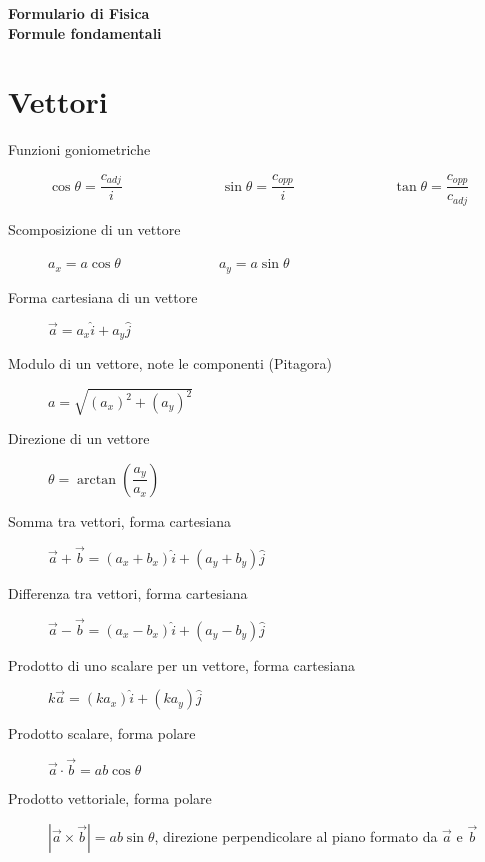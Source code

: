 \documentclass[a4paper,11pt,italian]{article}
\begin{document}
\begin{center}
\textbf{\Large \color{colorSitoScuro}Formulario di Fisica}\\
\textbf{\large \color{colorSitoScuro}Formule fondamentali}
\end{center}
\section{Vettori}
\begin{description}
  \item[Funzioni goniometriche]   $ \cos\theta = \dfrac{c_{adj}}{i} $~~~~~~~~~~~~~~$ \sin\theta = \dfrac{c_{opp}}{i} $~~~~~~~~~~~~~~$ \tan\theta = \dfrac{c_{opp}}{c_{adj}} $
  
  \item[Scomposizione di un vettore] $ a_x = a  \cos\theta $~~~~~~~~~~~~~~$ a_y = a  \sin\theta $
  
  \item[Forma cartesiana di un vettore] $ \vec{a} = a_x \hat{i} + a_y \hat{j} $
  
  \item[Modulo di un vettore, note le componenti (Pitagora)] $ a = \sqrt{(a_x)^2 + (a_y)^2} $
  
  \item[Direzione di un vettore] $ \theta  = \arctan\left( \dfrac{a_y}{a_x} \right) $

  \item[Somma tra vettori, forma cartesiana]
  $ \vec{a} + \vec{b} =  (a_x + b_x) \hat{i} + (a_y + b_y) \hat{j}  $
  
  \item[Differenza tra vettori, forma cartesiana]
  $\vec{a} - \vec{b} =  (a_x - b_x) \hat{i} + (a_y - b_y) \hat{j} $
 
  
  \item[Prodotto di uno scalare per un vettore, forma cartesiana] $ k \vec{a} = (k a_x)\hat{i} + (k a_y)\hat{j} $
  
  \item[Prodotto scalare, forma polare]$ \vec{a} \cdot \vec{b} = ab\cos\theta $
  
  \item[Prodotto vettoriale, forma polare]$ | \vec{a} \times \vec{b} | = ab\sin\theta $, direzione perpendicolare al piano formato da $ \vec{a} $ e $ \vec{b} $
\end{description}
   
\end{document}
